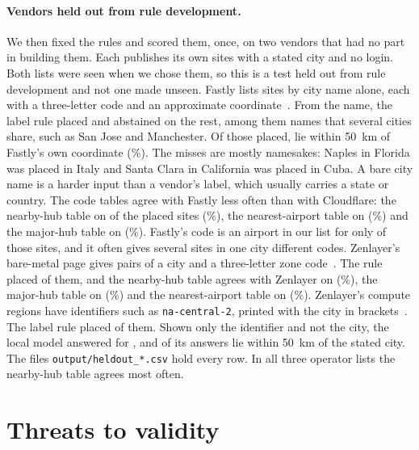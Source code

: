 \documentclass[10pt,twocolumn]{article}
\newcommand{\code}[1]{\texttt{#1}}
\begin{document}
\paragraph{Vendors held out from rule development.} We then fixed the rules and scored them, once, on two vendors that had no part in building them. Each publishes its own sites with a stated city and no login. Both lists were seen when we chose them, so this is a test held out from rule development and not one made unseen. Fastly lists \fastlySites{} sites by city name alone, each with a three-letter code and an approximate coordinate~\citep{fastly_pops}. From the name, the label rule placed \fastlyPlaced{} and abstained on the rest, among them names that several cities share, such as San Jose and Manchester. Of those placed, \fastlyNear{} lie within 50~km of Fastly's own coordinate (\fastlyNearShare{}\%). The misses are mostly namesakes: Naples in Florida was placed in Italy and Santa Clara in California was placed in Cuba. A bare city name is a harder input than a vendor's label, which usually carries a state or country. The code tables agree with Fastly less often than with Cloudflare: the nearby-hub table on \fastlyNearbyHub{} of the \fastlyPlaced{} placed sites (\fastlyNearbyHubShare{}\%), the nearest-airport table on \fastlyNearest{} (\fastlyNearestShare{}\%) and the major-hub table on \fastlyMajorHub{} (\fastlyMajorHubShare{}\%). Fastly's code is an airport in our list for only \fastlyCodeIsAirport{} of those sites, and it often gives several sites in one city different codes. Zenlayer's bare-metal page gives \zenlayerZonesSites{} pairs of a city and a three-letter zone code~\citep{zenlayer_bare_metal}. The rule placed \zenlayerZonesPlaced{} of them, and the nearby-hub table agrees with Zenlayer on \zenlayerZonesNearbyHub{} (\zenlayerZonesNearbyHubShare{}\%), the major-hub table on \zenlayerZonesMajorHub{} (\zenlayerZonesMajorHubShare{}\%) and the nearest-airport table on \zenlayerZonesNearest{} (\zenlayerZonesNearestShare{}\%). Zenlayer's \zenlayerRegions{} compute regions have identifiers such as \code{na-central-2}, printed with the city in brackets~\citep{zenlayer_compute}. The label rule placed \zenlayerRegionsPlaced{} of them. Shown only the identifier and not the city, the local model answered for \zenlayerMemoryAnswered{}, and \zenlayerMemoryNear{} of its answers lie within 50~km of the stated city. The files \code{output/heldout\_*.csv} hold every row. In all three operator lists the nearby-hub table agrees most often.

\section{Threats to validity}
\label{sec:threats}
\end{document}
